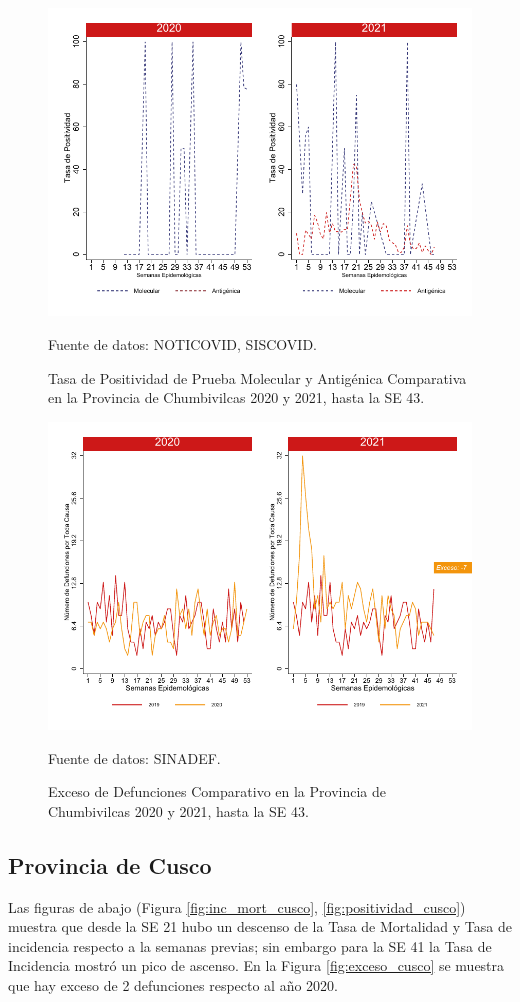 \documentclass[12pt,a4paper,openany]{book}
\begin{document}
		\begin{figure}[h]
			\caption{Tasa de Positividad de Prueba Molecular y Antigénica Comparativa en la Provincia de Chumbivilcas 2020 y 2021, hasta la SE 43.}\label{fig:positividad_chumbivilcas}
			\begin{center}
				\includegraphics[width=0.7\linewidth]{../figuras/positividad_20_21_6}
			\end{center}
			{\footnotesize {Fuente de datos: NOTICOVID, SISCOVID.}}
		\end{figure}
		
		\begin{figure}[h]
			\caption{Exceso de Defunciones Comparativo en la Provincia de Chumbivilcas 2020 y 2021, hasta la SE 43.}\label{fig:exceso_chumbivilcas}
			\begin{center}
				\includegraphics[width=0.7\linewidth]{../figuras/exceso_6}
			\end{center}
			{\footnotesize {Fuente de datos: SINADEF.}}
		\end{figure}
		
		\clearpage
		
		\subsection*{Provincia de Cusco}
		\noindent Las figuras de abajo (Figura \ref{fig:inc_mort_cusco}, \ref{fig:positividad_cusco}) muestra que desde la SE 21 hubo un descenso de la Tasa de Mortalidad y Tasa de incidencia respecto a la semanas previas; sin embargo para la SE 41 la Tasa de Incidencia mostró un pico de ascenso. En la Figura \ref{fig:exceso_cusco} se muestra que hay exceso de 2 defunciones respecto al año 2020.
		
\end{document}
